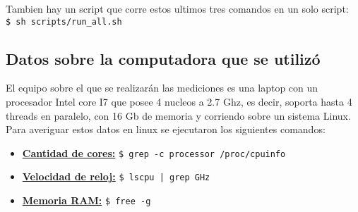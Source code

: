     \hfill \break
    Tambien hay un script que corre estos ultimos tres comandos en un solo script:\\
    \lstinline[columns=fixed]{$ sh scripts/run_all.sh}

\subsection{Datos sobre la computadora que se utilizó}
    El equipo sobre el que se realizarán las mediciones es una laptop con un
    procesador Intel core I7 que posee 4 nucleos a 2.7 Ghz, es decir, soporta
    hasta 4 threads en paralelo, con 16 Gb de memoria y corriendo sobre un
    sistema Linux.\\
    Para averiguar estos datos en linux se ejecutaron los siguientes comandos:\\
    \begin{itemize}
        \item \underline{\textbf{Cantidad de cores:}} \lstinline[columns=fixed]{$ grep -c processor /proc/cpuinfo}
        \item \underline{\textbf{Velocidad de reloj:}} \lstinline[columns=fixed]{$ lscpu | grep GHz}
        \item \underline{\textbf{Memoria RAM:}} \lstinline[columns=fixed]{$ free -g}
    \end{itemize}